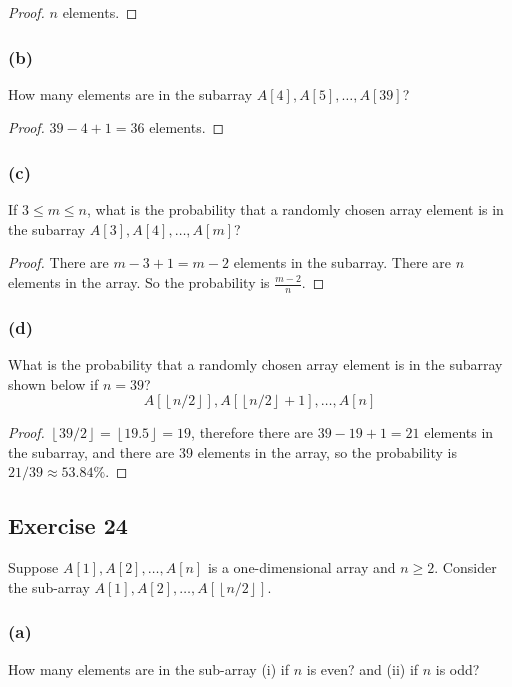 \documentclass[14pt]{extarticle}
\newcommand{\floor}[1]{{\left\lfloor#1\right\rfloor}}
\begin{document}
\begin{proof}
$n$ elements.
\end{proof}

\subsubsection{(b)}
How many elements are in the subarray \(A[4], A[5], \ldots, A[39]\)?

\begin{proof}
\(39 - 4 + 1 = 36\) elements.
\end{proof}

\subsubsection{(c)}
If \(3 \leq m \leq n\), what is the probability that a randomly chosen array element is in the subarray 
\(A[3], A[4], \ldots, A[m]\)?

\begin{proof}
There are \(m - 3 + 1 = m-2\) elements in the subarray. There are $n$ elements in the array. So the probability is 
\(\frac{m-2}{n}\).
\end{proof}

\subsubsection{(d)}
What is the probability that a randomly chosen array element is in the subarray shown below if \(n = 39\)?
\[A[\floor{n/2}], A[\floor{n/2}+1], \ldots, A[n]\]
\begin{proof}
\(\floor{39/2} = \floor{19.5} = 19\), therefore there are \(39 - 19 + 1 = 21\) elements in the subarray, and there 
are 39 elements in the array, so the probability is \(21/39 \approx 53.84\%\).
\end{proof}

\subsection{Exercise 24}
Suppose \(A[1], A[2], \ldots, A[n]\) is a one-dimensional array and \(n \geq 2\). Consider the sub-array 
\(A[1], A[2], \ldots, A[\floor{n/2}]\).

\subsubsection{(a)}
How many elements are in the sub-array (i) if $n$ is even? and (ii) if $n$ is odd?
\end{document}
